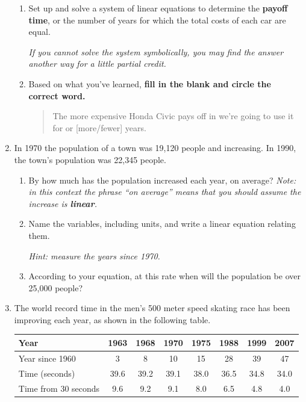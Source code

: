 \documentclass[12pt]{article}
\begin{document}
\begin{enumerate}
\begin{enumerate}
\item Set up and solve a system of linear equations to determine the \textbf{payoff time}, or the number of years for which the total costs of each car are equal.

\emph{If you cannot solve the system symbolically, you may find the answer another way for a little partial credit.}
\vfill

\item Based on what you've learned, \textbf{fill in the blank and circle the correct word.}

\begin{quote}
The more expensive Honda Civic pays off in we're going to use it for \hrulefill   or [more/fewer] years.  
\end{quote}

\end{enumerate}

\newpage



\item In 1970 the population of a town was 19,120 people and increasing.  In 1990, the town's population was 22,345 people.

\begin{enumerate}
\item By how much has the population increased each year, on average?  \emph{Note:  in this context the phrase ``on average'' means that you should assume the increase is \textbf{linear}.}
\vfill
\item Name the variables, including units, and write a linear equation relating them.

\emph{Hint:  measure the years since 1970.}
\vfill
\item According to your equation, at this rate when will the population be over 25,000 people?
\vfill
\end{enumerate}

\newpage %

\item The world record time in the men's 500 meter speed skating race has been improving each year, as shown in the following table.

\begin{center}
\begin{tabular} {|l|c|c |c|c|c|c|c|}  \hline
Year & 1963 & 1968 & 1970 & 1975 & 1988 & 1999 & 2007  \\ \hline
Year since 1960 & 3 & 8 & 10 & 15 & 28 & 39 & 47  \\ \hline
Time (seconds) & 39.6 & 39.2 & 39.1 & 38.0 & 36.5 & 34.8 & 34.0  \\ \hline
Time from 30 seconds & 9.6 & 9.2 & 9.1 & 8.0 & 6.5 & 4.8 & 4.0  \\ \hline
\end{tabular}
\end{center}


\end{enumerate}
\end{document}

